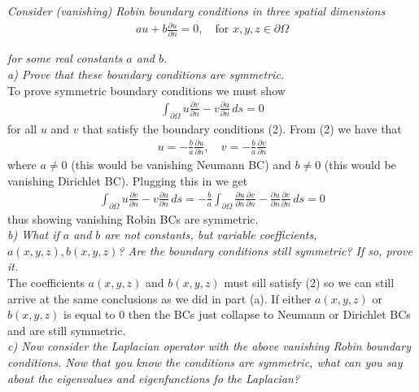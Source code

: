 \documentclass[12pt]{article}
\theoremstyle{remark}
\begin{document}
\textit{Consider (vanishing) Robin boundary conditions in three spatial dimensions}
\begin{align}
	au + b\frac{\partial u}{\partial n} = 0, \quad \text{for } x,y,z \in \partial\Omega
\end{align} 

\textit{for some real constants $a$ and $b$.} \\

\textit{a) Prove that these boundary conditions are symmetric.} \\

To prove symmetric boundary conditions we must show
\begin{align*}
	\int_{\partial\Omega} u\frac{\partial v}{\partial n} - v\frac{\partial u}{\partial n} \, ds = 0
\end{align*}
for all $u$ and $v$ that satisfy the boundary conditions (2). From (2) we have that 
\begin{align*}
	u = -\frac{b}{a}\frac{\partial u}{\partial n}, \quad v = -\frac{b}{a}\frac{\partial v}{\partial n}
\end{align*}
where $a \neq 0$ (this would be vanishing Neumann BC) and $b \neq 0$ (this would be vanishing Dirichlet BC). Plugging this in we get
\begin{align*}
	\int_{\partial\Omega} u\frac{\partial v}{\partial n} - v\frac{\partial u}{\partial n} \, ds = -\frac{b}{a}\int_{\partial \Omega}\frac{\partial u}{\partial n}\frac{\partial v}{\partial n} - \frac{\partial u}{\partial n}\frac{\partial v}{\partial n} \, ds = 0
\end{align*}
thus showing vanishing Robin BCs are symmetric. \\

\textit{b) What if $a$ and $b$ are not constants, but variable coefficients, $a(x,y,z), b(x,y,z)$? Are the boundary conditions still symmetric? If so, prove it.} \\

The coefficients $a(x,y,z)$ and $b(x,y,z)$ must sill satisfy (2) so we can still arrive at the same conclusions as we did in part (a). If either $a(x,y,z)$ or $b(x,y,z)$ is equal to 0 then the BCs just collapse to Neumann or Dirichlet BCs and are still symmetric. \\

\textit{c) Now consider the Laplacian operator with the above vanishing Robin boundary conditions. Now that you know the conditions are symmetric, what can you say about the eigenvalues and eigenfunctions fo the Laplacian?} \\
\end{document}
